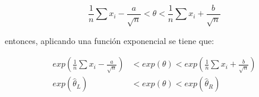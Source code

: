 \begin{enumerate}
          \begin{equation*}
              \frac{1}{n} \sum x_i - \frac{a}{\sqrt{n}}<\theta<\frac{1}{n} \sum x_i + \frac{b}{\sqrt{n}}
          \end{equation*}

          entonces, aplicando una función exponencial se tiene que:

          \begin{align*}
              exp\left (\frac{1}{n} \sum x_i - \frac{a}{\sqrt{n}}\right ) & <exp(\theta)<exp\left ( \frac{1}{n} \sum x_i + \frac{b}{\sqrt{n}} \right ) \\
              exp(\hat{\theta}_L)                                         & < exp(\theta) < exp(\hat{\theta}_R)
          \end{align*}
\end{enumerate}